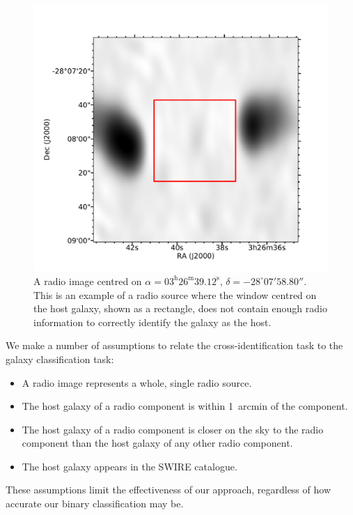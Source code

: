 \documentclass[fleqn,usenatbib,usedcolumn]{mnras}
\begin{document}
        \begin{figure}
      \centering
      \includegraphics[width=\linewidth]{images/CI2363_fig.pdf}
      \caption{A radio image centred on $\alpha =
        03^\text{h}26^\text{m}39.12^\text{s}$, $\delta = -28^\circ{}07'58.80''$.        %
        This is an example of a radio source where the window centred on the
        host galaxy, shown as a rectangle, does not contain enough radio
        information to correctly identify the galaxy as the host.}
      \label{fig:broken-window-size}
    \end{figure}

    We make a number of assumptions to relate the cross-identification task to
    the galaxy classification task:
    \begin{itemize}
      \item A radio image represents a whole, single radio source.
      \item The host galaxy of a radio component is within 1~arcmin of the
        component.
      \item The host galaxy of a radio component is closer on the sky to the
        radio component than the host galaxy of any other radio component.
      \item The host galaxy appears in the SWIRE catalogue.
    \end{itemize}
    These assumptions limit the effectiveness of our approach, regardless of
    how accurate our binary classification may be.
\end{document}
